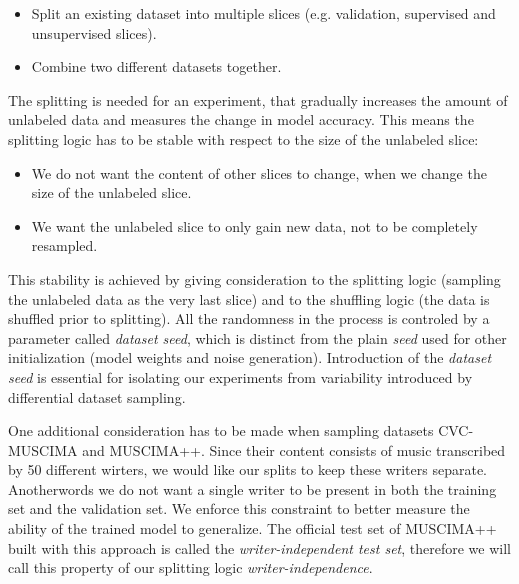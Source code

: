 \begin{itemize}
    \item Split an existing dataset into multiple slices (e.g. validation, supervised and unsupervised slices).
    \item Combine two different datasets together.
\end{itemize}

The splitting is needed for an experiment, that gradually increases the amount of unlabeled data and measures the change in model accuracy. This means the splitting logic has to be stable with respect to the size of the unlabeled slice:

\begin{itemize}
    \item We do not want the content of other slices to change, when we change the size of the unlabeled slice.
    \item We want the unlabeled slice to only gain new data, not to be completely resampled.
\end{itemize}

This stability is achieved by giving consideration to the splitting logic (sampling the unlabeled data as the very last slice) and to the shuffling logic (the data is shuffled prior to splitting). All the randomness in the process is controled by a parameter called \emph{dataset seed}, which is distinct from the plain \emph{seed} used for other initialization (model weights and noise generation). Introduction of the \emph{dataset seed} is essential for isolating our experiments from variability introduced by differential dataset sampling.

One additional consideration has to be made when sampling datasets CVC-MUSCIMA and MUSCIMA++. Since their content consists of music transcribed by 50 different wirters, we would like our splits to keep these writers separate. Anotherwords we do not want a single writer to be present in both the training set and the validation set. We enforce this constraint to better measure the ability of the trained model to generalize. The official test set of MUSCIMA++ built with this approach is called the \emph{writer-independent test set}, therefore we will call this property of our splitting logic \emph{writer-independence}.


